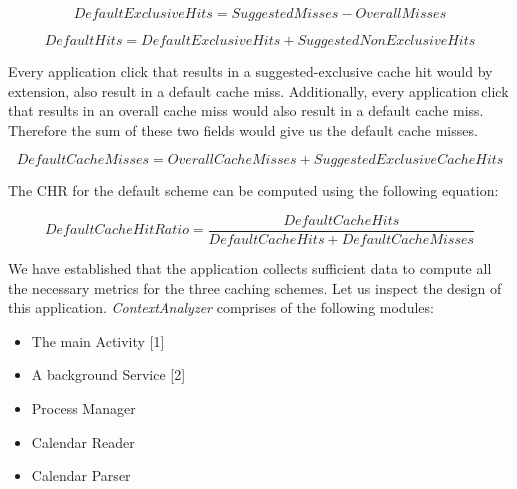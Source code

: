 \documentclass[12pt]{uthesis-v12}  %
\begin{document}
		\begin{equation}
			DefaultExclusive Hits = Suggested Misses - Overall Misses
		\end{equation}
		
		\begin{equation}
			Default Hits = DefaultExclusive Hits + Suggested NonExclusive Hits 
		\end{equation}
		
		Every application click that results in a suggested-exclusive cache hit would by extension, also result in a default cache miss. Additionally, every application click that results in an overall cache miss would also result in a default cache miss. Therefore the sum of these two fields would give us the default cache misses.
		
		\begin{equation}
			Default Cache Misses = Overall Cache Misses + Suggested Exclusive Cache Hits
		\end{equation}
		
		The CHR for the default scheme can be computed using the following equation:
		
		\begin{equation}
			Default Cache Hit Ratio = \frac{Default Cache Hits}{Default Cache Hits + Default Cache Misses}
		\end{equation}
		
		We have established that the application collects sufficient data to compute all the necessary metrics for the three caching schemes. Let us inspect the design of this application. {\em ContextAnalyzer} comprises of the following modules:
		
		\begin{itemize}
			\item The main Activity [1]
			\item A background Service [2]
			\item Process Manager
			\item Calendar Reader
			\item Calendar Parser
		\end{itemize}
		
\end{document}
